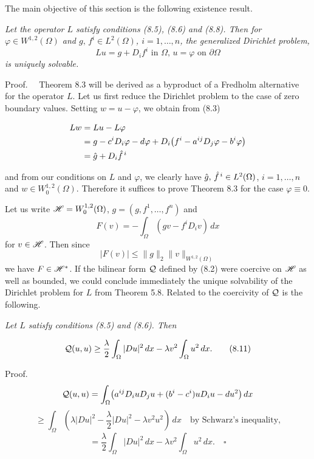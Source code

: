 The main objective of this section is the following existence result.

\begin{theorem}\label{gt-thm-8-3-solvability-generalized-dirichlet}
\emph{Let the operator $L$ satisfy conditions (8.5), (8.6) and (8.8). Then for $\varphi \in W^{1,2}(\Omega)$ and $g,\, f^i \in L^2(\Omega)$, $i=1,\ldots,n$, the generalized Dirichlet problem,}
\[
Lu=g+D_i f^i \text{ in } \Omega, \, u=\varphi \text{ on } \partial\Omega
\]
\emph{is uniquely solvable.}
\end{theorem}

Proof. \ \ Theorem 8.3 will be derived as a byproduct of a Fredholm alternative for the operator $L$. Let us first reduce the Dirichlet problem to the case of zero boundary values. Setting $w=u-\varphi$, we obtain from (8.3)

\[
\begin{aligned}
Lw &= Lu-L\varphi \\
&= g-c^i D_i\varphi-d\varphi + D_i\bigl(f^i-a^{ij}D_j\varphi-b^i\varphi\bigr) \\
&= \hat g + D_i \hat f^{\,i}
\end{aligned}
\]

and from our conditions on $L$ and $\varphi$, we clearly have $\hat g,\, \hat f^{\,i} \in L^2(\Omega)$, $i=1,\ldots,n$
and $w \in W^{1,2}_0(\Omega)$. Therefore it suffices to prove Theorem 8.3 for the case $\varphi \equiv 0$.

Let us write $\mathscr{H} = W^{1,2}_0(\Omega)$, $g=(g,f^1,\ldots,f^n)$ and
\[
F(v) = -\int_{\Omega} (gv-f^i D_i v)\,dx
\]
for $v \in \mathscr{H}$. Then since
\[
|F(v)| \le \|g\|_2 \|v\|_{W^{1,2}(\Omega)}
\]
we have $F \in \mathscr{H}^{*}$. If the bilinear form $\mathcal{Q}$ defined by (8.2) were coercive on $\mathscr{H}$ as well
as bounded, we could conclude immediately the unique solvability of the Dirichlet
problem for $L$ from Theorem 5.8. Related to the coercivity of $\mathcal{Q}$ is the following.

\begin{lemma}\label{gt-lem-8-4-coercivity-estimate}
\emph{Let $L$ satisfy conditions (8.5) and (8.6). Then}

\begin{equation}
\mathcal{Q}(u,u) \ge \frac{\lambda}{2}\int_{\Omega} |Du|^2\,dx - \lambda v^2 \int_{\Omega} u^2\,dx.
\tag{8.11}
\end{equation}

Proof. \ \[
\mathcal{Q}(u,u)=\int_{\Omega}\bigl(a^{ij}D_i u D_j u +(b^i-c^i)uD_i u-du^2\bigr)\,dx
\]
\[
\ge \int_{\Omega}\left(\lambda |Du|^2-\frac{\lambda}{2}|Du|^2-\lambda v^2u^2\right)\,dx \quad \text{by Schwarz's inequality,}
\]
\[
=\frac{\lambda}{2}\int_{\Omega}|Du|^2\,dx-\lambda v^2\int_{\Omega}u^2\,dx.\quad \square
\]
\end{lemma}


